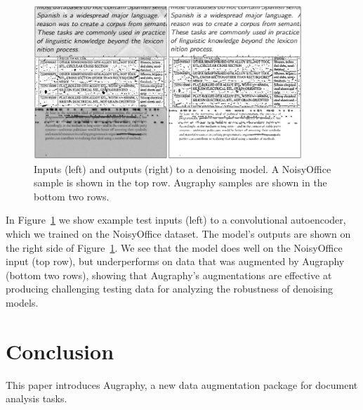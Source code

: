 \documentclass[runningheads]{llncs}
\begin{document}
\begin{figure}
    \centering
    \includegraphics[width=0.9\textwidth]{augraphy_noisy_office_qualitative_comparison_figure.pdf}
    \caption{Inputs (left) and outputs (right) to a denoising model. A NoisyOffice \cite{noisyoffice} sample is shown in the top row. Augraphy samples are shown in the bottom two rows.}
    \label{fig:noisy_office_comparison}
\end{figure}

In Figure~\ref{fig:noisy_office_comparison} we show example test inputs (left) to a convolutional autoencoder, which we trained on the NoisyOffice dataset.
The model's outputs are shown on the right side of Figure~\ref{fig:noisy_office_comparison}.
We see that the model does well on the NoisyOffice input (top row), but underperforms on data that was augmented by Augraphy (bottom two rows), showing that Augraphy's augmentations are effective at producing challenging testing data for analyzing the robustness of denoising models.



\section{Conclusion}
This paper introduces Augraphy, a new data augmentation package for document analysis tasks.
\end{document}
